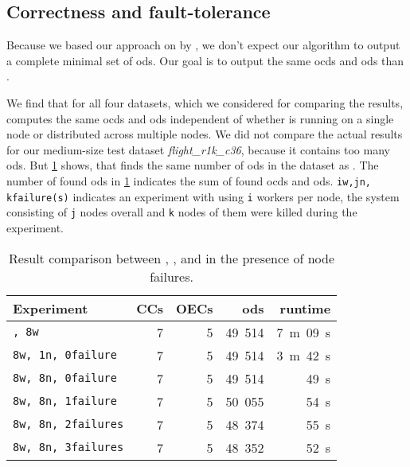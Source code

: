 \subsection{Correctness and fault-tolerance}\label{sec:evaluation:correctness}

  Because we based our approach on \ocddiscover{} by \citeauthor{consonni}, we don't expect our algorithm to output a complete minimal set of \glspl{od}.
  Our goal is to output the same \glspl{ocd} and \glspl{od} than \ocddiscover{}.

  We find that for all four datasets, which we considered for comparing the results, \dodo{} computes the same \glspl{ocd} and \glspl{od} independent of whether \dodo{} is running on a single node or distributed across multiple nodes.
  We did not compare the actual results for our medium-size test dataset \textit{flight\_r1k\_c36}, because it contains too many \glspl{od}.
  But \cref{tab:results} shows, that \dodo{} finds the same number of \glspl{od} in the dataset as \ocddiscover{}.
  The number of found \glspl{od} in \cref{tab:results} indicates the sum of found \glspl{ocd} and \glspl{od}.
  \texttt{iw,jn, kfailure(s)} indicates an experiment with \dodo{} using \texttt{i} workers per node, the system consisting of \texttt{j} nodes overall and \texttt{k} nodes of them were killed during the experiment.

  \begin{table}
    \centering
    \begin{tabular}{lrrrr}
      \toprule
      \textbf{Experiment} & \textbf{CCs} & \textbf{OECs} & \textbf{\glspl{od}} & \textbf{runtime} \\
      \midrule
      \texttt{\ocddiscover{}, 8w} & 7 & 5 & 49~514 & 7~m~09~s \\
      \texttt{8w, 1n, 0failure} & 7 & 5 & 49~514 & 3~m~42~s \\
      \texttt{8w, 8n, 0failure} & 7 & 5 & 49~514 & 49~s \\
      \texttt{8w, 8n, 1failure} & 7 & 5 & 50~055 & 54~s \\
      \texttt{8w, 8n, 2failures} & 7 & 5 & 48~374 & 55~s \\
      \texttt{8w, 8n, 3failures} & 7 & 5 & 48~352 & 52~s \\
      \bottomrule
    \end{tabular}
    \caption{Result comparison between \ocddiscover{}, \dodo{}, and \dodo{} in the presence of node failures.}
    \label{tab:results}
  \end{table}

